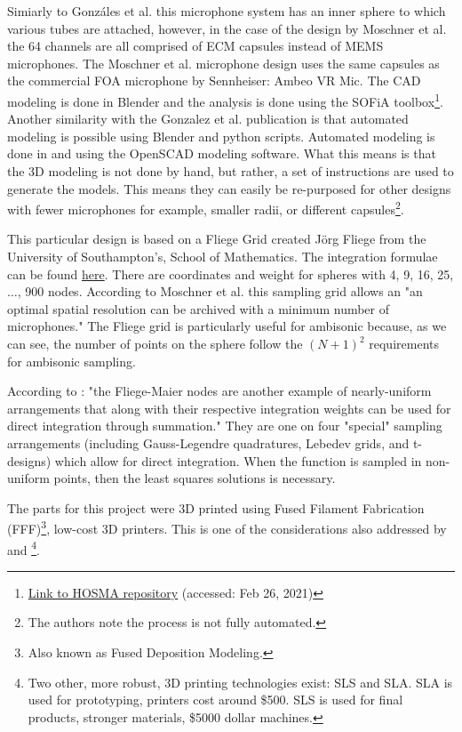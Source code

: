 Simiarly to Gonzáles et al. \cite{gonzalez2018modular} this microphone system has an inner sphere to which various tubes are attached, however, in the case of the design by Moschner et al. the 64 channels are all comprised of ECM capsules instead of MEMS microphones. The Moschner et al. microphone design uses the same capsules as the commercial FOA microphone by Sennheiser: Ambeo VR Mic. The CAD modeling is done in Blender and the analysis is done using the SOFiA toolbox\footnote{\href{https://github.com/AudioGroupCologne/hosma}{Link to HOSMA repository} (accessed: Feb 26, 2021)}. Another similarity with the Gonzalez et al. publication is that automated modeling is possible using Blender and python scripts. Automated modeling is done in \cite{gonzalez2018modular} and \cite{lopez2019sphear} using the OpenSCAD modeling software. What this means is that the 3D modeling is not done by hand, but rather, a set of instructions are used to generate the models. This means they can easily be re-purposed for other designs with fewer microphones for example, smaller radii, or different capsules\footnote{The authors note the process is not fully automated.}. 

This particular design is based on a Fliege Grid \cite{fliege1999distribution} created Jörg Fliege from the University of Southampton's, School of Mathematics. The integration formulae can be found \href{http://www.personal.soton.ac.uk/jf1w07/nodes/nodes.html}{here}. There are coordinates and weight for spheres with 4, 9, 16, 25,$\dots$, 900 nodes. According to Moschner et al. \cite{moschner2020development} this sampling grid allows an "an optimal spatial resolution can be archived with a minimum number of microphones." The Fliege grid is particularly useful for ambisonic because, as we can see, the number of points on the sphere follow the $(N + 1)^2$ requirements for ambisonic sampling.

According to \cite{SPHERICA45online}: "the Fliege-Maier nodes are another example of nearly-uniform arrangements that along with their respective integration weights can be used for direct integration through summation." They are one on four "special" sampling arrangements (including Gauss-Legendre quadratures, Lebedev grids, and t-designs) which allow for direct integration. When the function is sampled in non-uniform points, then the least squares solutions is necessary.

The parts for this project were 3D printed using Fused Filament Fabrication (FFF)\footnote{Also known as Fused Deposition Modeling.}, low-cost 3D printers. This is one of the considerations also addressed by \cite{lopez2019sphear} and \cite{gonzalez2018modular}\footnote{Two other, more robust, 3D printing technologies exist: SLS and SLA. SLA is used for prototyping, printers cost around \$500. SLS is used for final products, stronger materials, \$5000 dollar machines.}. 

